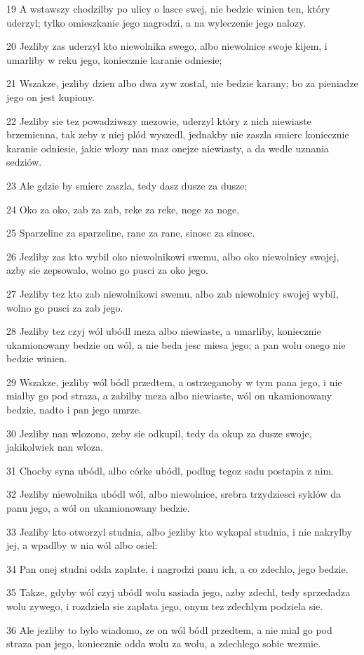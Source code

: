 \par 19 A wstawszy chodzilby po ulicy o lasce swej, nie bedzie winien ten, który uderzyl; tylko omieszkanie jego nagrodzi, a na wyleczenie jego nalozy.
\par 20 Jezliby zas uderzyl kto niewolnika swego, albo niewolnice swoje kijem, i umarliby w reku jego, koniecznie karanie odniesie;
\par 21 Wszakze, jezliby dzien albo dwa zyw zostal, nie bedzie karany; bo za pieniadze jego on jest kupiony.
\par 22 Jezliby sie tez powadziwszy mezowie, uderzyl który z nich niewiaste brzemienna, tak zeby z niej plód wyszedl, jednakby nie zaszla smierc koniecznie karanie odniesie, jakie wlozy nan maz onejze niewiasty, a da wedle uznania sedziów.
\par 23 Ale gdzie by smierc zaszla, tedy dasz dusze za dusze;
\par 24 Oko za oko, zab za zab, reke za reke, noge za noge,
\par 25 Sparzeline za sparzeline, rane za rane, sinosc za sinosc.
\par 26 Jezliby zas kto wybil oko niewolnikowi swemu, albo oko niewolnicy swojej, azby sie zepsowalo, wolno go pusci za oko jego.
\par 27 Jezliby tez kto zab niewolnikowi swemu, albo zab niewolnicy swojej wybil, wolno go pusci za zab jego.
\par 28 Jezliby tez czyj wól ubódl meza albo niewiaste, a umarliby, koniecznie ukamionowany bedzie on wól, a nie beda jesc miesa jego; a pan wolu onego nie bedzie winien.
\par 29 Wszakze, jezliby wól bódl przedtem, a ostrzeganoby w tym pana jego, i nie mialby go pod straza, a zabilby meza albo niewiaste, wól on ukamionowany bedzie, nadto i pan jego umrze.
\par 30 Jezliby nan wlozono, zeby sie odkupil, tedy da okup za dusze swoje, jakikolwiek nan wloza.
\par 31 Chocby syna ubódl, albo córke ubódl, podlug tegoz sadu postapia z nim.
\par 32 Jezliby niewolnika ubódl wól, albo niewolnice, srebra trzydziesci syklów da panu jego, a wól on ukamionowany bedzie.
\par 33 Jezliby kto otworzyl studnia, albo jezliby kto wykopal studnia, i nie nakrylby jej, a wpadlby w nia wól albo osiel:
\par 34 Pan onej studni odda zaplate, i nagrodzi panu ich, a co zdechlo, jego bedzie.
\par 35 Takze, gdyby wól czyj ubódl wolu sasiada jego, azby zdechl, tedy sprzedadza wolu zywego, i rozdziela sie zaplata jego, onym tez zdechlym podziela sie.
\par 36 Ale jezliby to bylo wiadomo, ze on wól bódl przedtem, a nie mial go pod straza pan jego, koniecznie odda wolu za wolu, a zdechlego sobie wezmie.

